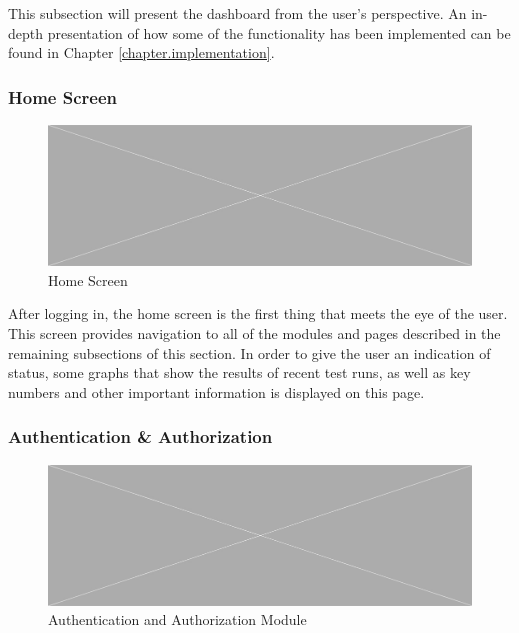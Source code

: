 This subsection will present the dashboard from the user's perspective. An in-depth presentation of how some of the functionality has been implemented can be found in Chapter \ref{chapter.implementation}.





\subsubsection{Home Screen}

\comment{\info[inline]{}}

\begin{figure}[h]
    \centering
    \includegraphics[width=\textwidth]{figures/placeholder.png}
    \caption{Home Screen}
    \label{fig.home}
\end{figure}
\noindent
After logging in, the home screen is the first thing that meets the eye of the user. This screen provides navigation to all of the modules and pages described in the remaining subsections of this section. In order to give the user an indication of status, some graphs that show the results of recent test runs, as well as key numbers and other important information is displayed on this page.


\subsubsection{Authentication \& Authorization}


\begin{figure}[h]
    \centering
    \includegraphics[width=\textwidth]{figures/placeholder.png}
    \caption{Authentication and Authorization Module}
    \label{fig.tc_mod}
\end{figure}

